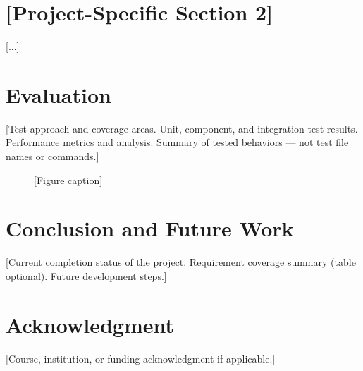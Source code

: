 \documentclass[conference]{IEEEtran}
\begin{document}
\section{[Project-Specific Section 2]}
[...]

\section{Evaluation}

[Test approach and coverage areas.
Unit, component, and integration test results.
Performance metrics and analysis.
Summary of tested behaviors — not test file names or commands.]

\begin{figure}[H]
  \centering
  \caption{[Figure caption]}
  \label{fig:result_1}
\end{figure}

\section{Conclusion and Future Work}

[Current completion status of the project.
Requirement coverage summary (table optional).
Future development steps.]

\section*{Acknowledgment}
[Course, institution, or funding acknowledgment if applicable.]



\end{document}
